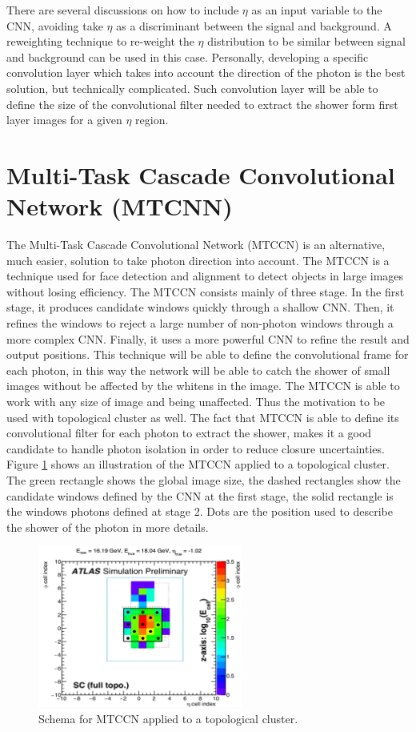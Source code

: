 There are several discussions on how to include $\eta$ as an input variable to the CNN, avoiding take $\eta$ as a discriminant between the signal and background. A reweighting technique to re-weight the $\eta$ distribution to be similar between signal and background can be used in this case. Personally, developing a specific convolution layer which takes into account the direction of the photon is the best solution, but technically complicated. Such convolution layer will be able to define the size of the convolutional filter needed to extract the shower form first layer images for a given $\eta$ region. \\

\section{Multi-Task Cascade Convolutional Network (MTCNN)}

The Multi-Task Cascade Convolutional Network (MTCCN) is an alternative, much easier, solution to take photon direction into account. The MTCCN is a technique used for face detection and alignment to detect objects in large images without losing efficiency. The MTCCN consists mainly of three stage. In the first stage, it produces candidate windows quickly through a shallow CNN. Then,  it  refines the windows to reject a large number of non-photon windows through a more complex CNN. Finally, it uses a more powerful CNN to refine the result and output positions. This technique will be able to define the convolutional frame for each photon, in this way the network will be able to catch the shower of small images without be affected by the whitens in the image. The MTCCN is able to work with any size of image and being unaffected. Thus the motivation to be used with topological cluster as well. The fact that MTCCN is able to define its convolutional filter for each photon to extract the shower, makes it a good candidate to handle photon isolation in order to reduce closure uncertainties. Figure \ref{fig:Adx3:MTCCN} shows an illustration of the MTCCN applied to a topological cluster. The green rectangle shows the global image size, the dashed rectangles show the candidate windows defined by the CNN at the first stage, the solid rectangle is the windows photons defined at stage 2. Dots are the position used to describe the shower of the photon in more details. 
\begin{figure}[htbp]
    \centering
    \includegraphics[width=0.6\textwidth]{Adx/Adx3/Img/MTCCN.png}
    \caption{Schema for MTCCN applied to a topological cluster.}
    \label{fig:Adx3:MTCCN}
\end{figure}

